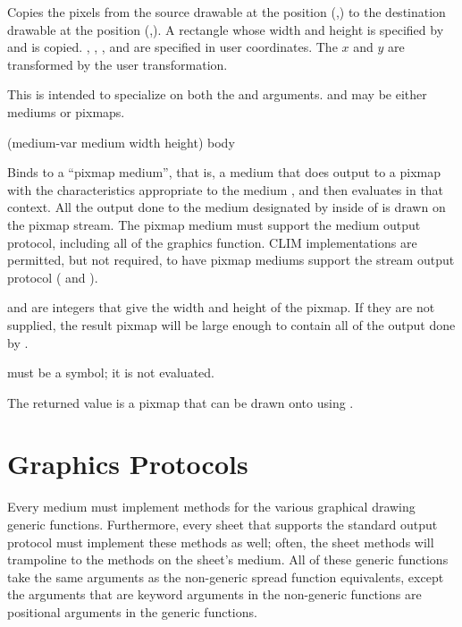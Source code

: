 Copies the pixels from the source drawable  at the position
(,) to the destination drawable  at the
position (,).  A rectangle whose width and height is
specified by  and  is copied.  ,
, , and  are specified in user coordinates.
The $x$ and $y$ are transformed by the user transformation.

This is intended to specialize on both the  and
 arguments.   and  may be
either mediums or pixmaps.


 {(medium-var medium \key width height) \body body}

Binds  to a ``pixmap medium'', that is, a medium that does
output to a pixmap with the characteristics appropriate to the medium
, and then evaluates  in that context.  All the output done
to the medium designated by  inside of  is drawn on
the pixmap stream.  The pixmap medium must support the medium output protocol,
including all of the graphics function.  CLIM implementations are permitted, but
not required, to have pixmap mediums support the stream output protocol
( and ).

 and  are integers that give the width and height of the
pixmap.  If they are not supplied, the result pixmap will be large enough to
contain all of the output done by .

 must be a symbol; it is not evaluated.

The returned value is a pixmap that can be drawn onto  using
.


\section {Graphics Protocols\label{graphics-protocols}}

Every medium must implement methods for the various graphical drawing generic
functions.  Furthermore, every sheet that supports the standard output protocol
must implement these methods as well; often, the sheet methods will trampoline
to the methods on the sheet's medium.  All of these generic functions take the
same arguments as the non-generic spread function equivalents, except the
arguments that are keyword arguments in the non-generic functions are positional
arguments in the generic functions.

